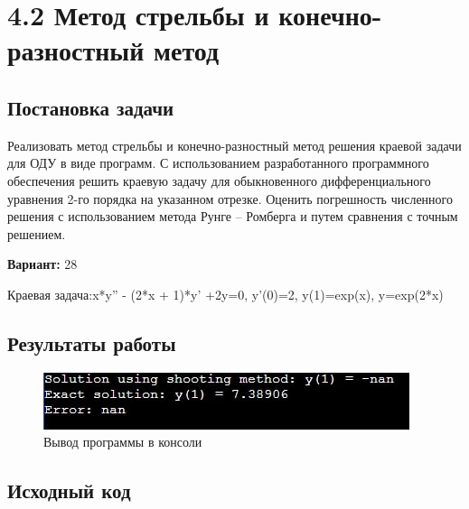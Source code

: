 
\pagebreak

\section* {4.2 Метод стрельбы и конечно-разностный метод}

\subsection{Постановка задачи}
Реализовать метод стрельбы и конечно-разностный метод решения краевой задачи для ОДУ в виде программ. С использованием разработанного программного обеспечения решить краевую задачу для обыкновенного дифференциального уравнения 2-го порядка на указанном отрезке. Оценить погрешность численного решения с использованием метода Рунге – Ромберга и путем сравнения с точным решением. 

{\bfseries Вариант:} 28

Краевая задача:{x*y'' - (2*x + 1)*y' +2y=0, y'(0)=2, y(1)=exp(x)}, y=exp(2*x)

\subsection{Результаты работы}
\begin{figure}[h!]
\centering
\includegraphics[width=.9\textwidth]{img/img2.jpg}
\caption{Вывод программы в консоли}
\end{figure}

\pagebreak

\subsection{Исходный код}


